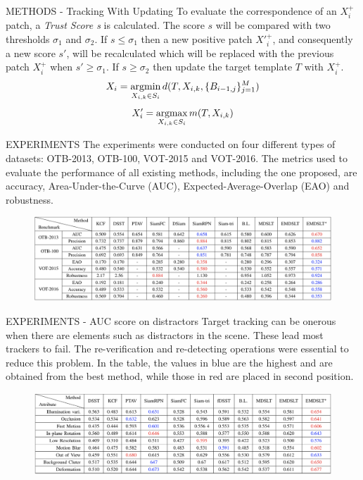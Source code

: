 \begin{frame}{METHODS - Tracking With Updating}
    To evaluate the correspondence of an $X_i^+$ patch, a \emph{Trust Score s} is calculated. The score $s$ will be compared with two thresholds $\sigma_1$ and $\sigma_2$.
    If $s\leq\sigma_1$ then a new positive patch $X{'}_i^+$, and consequently a new score $s'$, will be recalculated which will be replaced with the previous patch $X_i^+$ when $s'\geq\sigma_1$.
    If $s\geq\sigma_2$ then update the target template $T$ with $X_i^+$.
    \begin{equation}\label{distanceFunc}
        X_i = \operatorname*{argmin}_{X_{i,k} \in S_i}d(T,X_{i,k}, \{B_{i-1,j}\}^M_{j=1})
    \end{equation}
    \begin{equation}\label{newX}
        X'_i = \operatorname*{argmax}_{X_{i,k} \in S_i}m(T,X_{i,k})
    \end{equation}
\end{frame}

\begin{frame}{EXPERIMENTS}
    The experiments were conducted on four different types of datasets: 
    OTB-2013, OTB-100, VOT-2015 and VOT-2016. The metrics used to 
    evaluate the performance of all existing methods, including the one 
    proposed, are accuracy, Area-Under-the-Curve (AUC), 
    Expected-Average-Overlap (EAO) and robustness.
    \begin{figure}[h!]
        \centering
        \includegraphics[width = \linewidth]{images/paper8/metrics.png}
        \centering
    \end{figure}
\end{frame}

\begin{frame}{EXPERIMENTS - AUC score on distractors}
    Target tracking can be onerous when there are elements such as 
    distractors in the scene. These lead most trackers to fail. The 
    re-verification and re-detecting operations were essential to reduce this 
    problem. In the table, the values in blue are the highest and are obtained 
    from the best method, while those in red are placed in second position.
    \begin{figure}[h!]
        \centering
        \includegraphics[width = \linewidth]{images/paper8/AUC.png}
        \centering
    \end{figure}
\end{frame}

